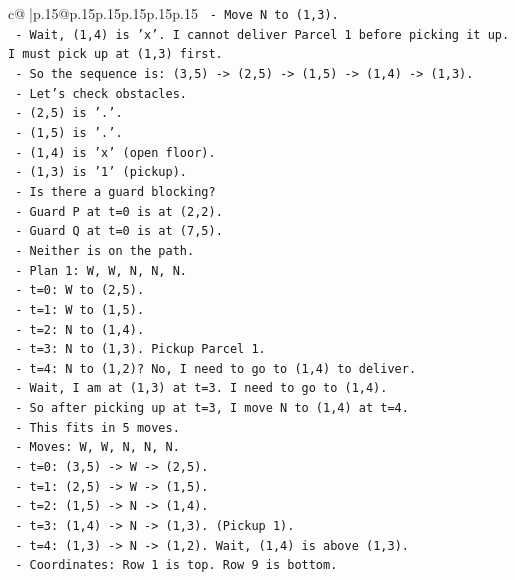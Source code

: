 \documentclass{article}
\begin{document}
{\begin{supertabular}{c@{$\;$}|p{.15\linewidth}@{}p{.15\linewidth}p{.15\linewidth}p{.15\linewidth}p{.15\linewidth}p{.15\linewidth}}
{{{\texttt{    {-} Move N to (1,3).} \\
\texttt{  {-} Wait, (1,4) is 'x'. I cannot deliver Parcel 1 before picking it up. I must pick up at (1,3) first.} \\
\texttt{  {-} So the sequence is: (3,5) {-}> (2,5) {-}> (1,5) {-}> (1,4) {-}> (1,3).} \\
\texttt{  {-} Let's check obstacles.} \\
\texttt{    {-} (2,5) is '.'.} \\
\texttt{    {-} (1,5) is '.'.} \\
\texttt{    {-} (1,4) is 'x' (open floor).} \\
\texttt{    {-} (1,3) is '1' (pickup).} \\
\texttt{  {-} Is there a guard blocking?} \\
\texttt{    {-} Guard P at t=0 is at (2,2).} \\
\texttt{    {-} Guard Q at t=0 is at (7,5).} \\
\texttt{    {-} Neither is on the path.} \\
\texttt{  {-} Plan 1: W, W, N, N, N.} \\
\texttt{    {-} t=0: W to (2,5).} \\
\texttt{    {-} t=1: W to (1,5).} \\
\texttt{    {-} t=2: N to (1,4).} \\
\texttt{    {-} t=3: N to (1,3). Pickup Parcel 1.} \\
\texttt{    {-} t=4: N to (1,2)? No, I need to go to (1,4) to deliver.} \\
\texttt{    {-} Wait, I am at (1,3) at t=3. I need to go to (1,4).} \\
\texttt{    {-} So after picking up at t=3, I move N to (1,4) at t=4.} \\
\texttt{    {-} This fits in 5 moves.} \\
\texttt{    {-} Moves: W, W, N, N, N.} \\
\texttt{    {-} t=0: (3,5) {-}> W {-}> (2,5).} \\
\texttt{    {-} t=1: (2,5) {-}> W {-}> (1,5).} \\
\texttt{    {-} t=2: (1,5) {-}> N {-}> (1,4).} \\
\texttt{    {-} t=3: (1,4) {-}> N {-}> (1,3). (Pickup 1).} \\
\texttt{    {-} t=4: (1,3) {-}> N {-}> (1,2). Wait, (1,4) is above (1,3).} \\
\texttt{    {-} Coordinates: Row 1 is top. Row 9 is bottom.} \\
}}}
\end{supertabular}}
\end{document}
